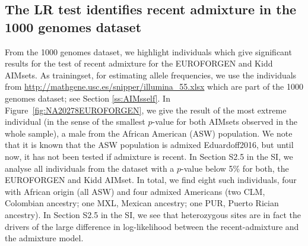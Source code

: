 \documentclass[12pt]{article}
\theoremstyle{definition}
\begin{document}
\subsection{The LR test identifies recent admixture in the 1000 genomes dataset}
From the 1000 genomes dataset, we highlight individuals which give significant results for the test of recent admixture for the EUROFORGEN and Kidd AIMsets. As trainingset, for estimating allele frequencies, we use the individuals from \url{http://mathgene.usc.es/snipper/illumina_55.xlsx} which are part of the 1000 genomes dataset; see Section \ref{ss:AIMsself}. 
In Figure~\ref{fig:NA20278EUROFORGEN}, we give the result of the most extreme individual (in the sense of the {\color{blue} smallest $p$-value for both AIMsets} observed in the whole sample), a male from the African American (ASW) population. We note that it is known that the ASW population is admixed \cite{article}{Eduardoff2016}, but until now, it has not been tested if admixture is recent. In  Section S2.5 in the SI, we analyse all individuals from the dataset with a $p$-value below 5\% for both, the EUROFORGEN and Kidd AIMset. In total, we find eight such individuals, four with African origin (all ASW) and four admixed Americans (two CLM, Colombian ancestry; one MXL, Mexican ancestry; one PUR, Puerto Rician ancestry). In  Section S2.5 in the SI, we see that heterozygous sites are in fact the drivers of the large difference in log-likelihood between the recent-admixture and the admixture model. 

\end{document}
